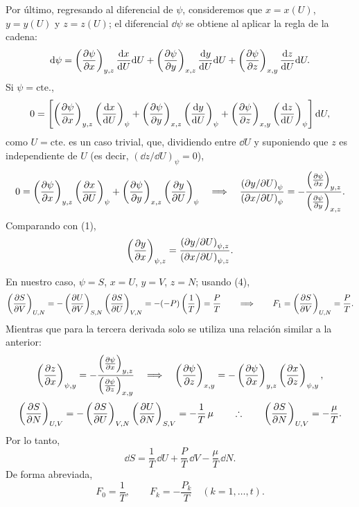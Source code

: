 Por último, regresando al diferencial de $\psi$, consideremos que $x=x(U)$, $y=y(U)$ y $z=z(U)$;
el diferencial $\dd\psi$ se obtiene al aplicar la regla de la cadena:
\begin{equation*}
  \dd\psi=\left(\frac{\partial \psi}{\partial x}\right)_{y,z}\frac{\dd x}{\dd U}\dd U+\left(\frac{\partial \psi}{\partial y}\right)_{x,z}\frac{\dd y}{\dd U}\dd U+\left(\frac{\partial \psi}{\partial z}\right)_{x,y}\frac{\dd z}{\dd U}\dd U.
\end{equation*}
Si $\psi=\text{cte.}$,
\begin{equation*}
  0=\left[\left(\frac{\partial \psi}{\partial x}\right)_{y,z}\left(\frac{\dd x}{\dd U}\right)_{\psi}+\left(\frac{\partial \psi}{\partial y}\right)_{x,z}\left(\frac{\dd y}{\dd U}\right)_{\psi}+\left(\frac{\partial \psi}{\partial z}\right)_{x,y}\left(\frac{\dd z}{\dd U}\right)_{\psi}\right]\dd U,
\end{equation*}
como $U=\text{cte.}$ es un caso trivial,
que, dividiendo entre $\dd U$ y suponiendo que $z$ es independiente de $U$ (es decir, $\left(\dd z/\dd U\right)_\psi=0$),
\begin{equation*}
  0=\left(\frac{\partial \psi}{\partial x}\right)_{y,z}\left(\frac{\partial x}{\partial U}\right)_{\psi}+\left(\frac{\partial \psi}{\partial y}\right)_{x,z}\left(\frac{\partial y}{\partial U}\right)_{\psi}
  \quad\Longrightarrow\quad
  \frac{\left(\partial y/\partial U\right)_\psi}{\left(\partial x/\partial U\right)_\psi}=-\frac{\left(\frac{\partial \psi}{\partial x}\right)_{y,z}}{\left(\frac{\partial \psi}{\partial y}\right)_{x,z}}.
\end{equation*}
Comparando con (1),
\begin{equation*}
  \left(\frac{\partial y}{\partial x}\right)_{\psi,z}=\frac{\left(\partial y/\partial U\right)_{\psi,z}}{\left(\partial x/\partial U\right)_{\psi,z}}.
\end{equation*}

En nuestro caso, $\psi=S$, $x=U$, $y=V$, $z=N$; usando (4),
\begin{equation*}
  \left(\frac{\partial S}{\partial V}\right)_{U,N}=-\left(\frac{\partial U}{\partial V}\right)_{S,N}\left(\frac{\partial S}{\partial U}\right)_{V,N}=-(-P)\left(\frac{1}{T}\right)=\frac{P}{T}
  \qquad\Longrightarrow\qquad
  F_1=\left(\frac{\partial S}{\partial V}\right)_{U,N}=\frac{P}{T}.
\end{equation*}
Mientras que para la tercera derivada solo se utiliza una relación similar a la anterior:
\begin{equation*}
  \left(\frac{\partial z}{\partial x}\right)_{\psi,y}=-\frac{\left(\frac{\partial \psi}{\partial x}\right)_{y,z}}{\left(\frac{\partial \psi}{\partial z}\right)_{x,y}}
  \quad\Longrightarrow\quad
  \left(\frac{\partial \psi}{\partial z}\right)_{x,y}=-\left(\frac{\partial \psi}{\partial x}\right)_{y,z}\left(\frac{\partial x}{\partial z}\right)_{\psi,y},
\end{equation*}
\begin{equation*}
  \left(\frac{\partial S}{\partial N}\right)_{U,V}=-\left(\frac{\partial S}{\partial U}\right)_{V,N}\left(\frac{\partial U}{\partial N}\right)_{S,V}=-\frac{1}{T}\,\mu
  \qquad\therefore\qquad
  \left(\frac{\partial S}{\partial N}\right)_{U,V}=-\frac{\mu}{T}.
\end{equation*}
Por lo tanto,
\begin{equation*}
  \dd S=\frac{1}{T}\,\dd U+\frac{P}{T}\,\dd V-\frac{\mu}{T}\,\dd N.
\end{equation*}
De forma abreviada,
\begin{equation*}
  F_0=\frac{1}{T},\qquad F_k=-\frac{P_k}{T}\quad(k=1,\dots,t).
\end{equation*}

